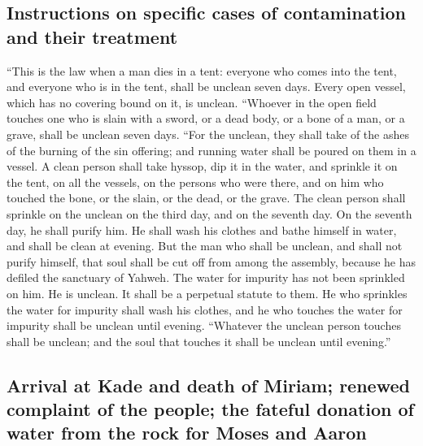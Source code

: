 \hypertarget{instructions-on-specific-cases-of-contamination-and-their-treatment}{%
\subsection{Instructions on specific cases of contamination and their
treatment}\label{instructions-on-specific-cases-of-contamination-and-their-treatment}}

 ``This is the law when a man dies in a tent: everyone
who comes into the tent, and everyone who is in the tent, shall be
unclean seven days.  Every open vessel, which has no
covering bound on it, is unclean.  ``Whoever in the open
field touches one who is slain with a sword, or a dead body, or a bone
of a man, or a grave, shall be unclean seven days.  ``For
the unclean, they shall take of the ashes of the burning of the sin
offering; and running water shall be poured on them in a vessel.
 A clean person shall take hyssop, dip it in the water,
and sprinkle it on the tent, on all the vessels, on the persons who were
there, and on him who touched the bone, or the slain, or the dead, or
the grave.  The clean person shall sprinkle on the
unclean on the third day, and on the seventh day. On the seventh day, he
shall purify him. He shall wash his clothes and bathe himself in water,
and shall be clean at evening.  But the man who shall be
unclean, and shall not purify himself, that soul shall be cut off from
among the assembly, because he has defiled the sanctuary of Yahweh. The
water for impurity has not been sprinkled on him. He is unclean.
 It shall be a perpetual statute to them. He who
sprinkles the water for impurity shall wash his clothes, and he who
touches the water for impurity shall be unclean until evening.
 ``Whatever the unclean person touches shall be unclean;
and the soul that touches it shall be unclean until evening.''

\hypertarget{arrival-at-kade-and-death-of-miriam-renewed-complaint-of-the-people-the-fateful-donation-of-water-from-the-rock-for-moses-and-aaron}{%
\subsection{Arrival at Kade and death of Miriam; renewed complaint of
the people; the fateful donation of water from the rock for Moses and
Aaron}\label{arrival-at-kade-and-death-of-miriam-renewed-complaint-of-the-people-the-fateful-donation-of-water-from-the-rock-for-moses-and-aaron}}

